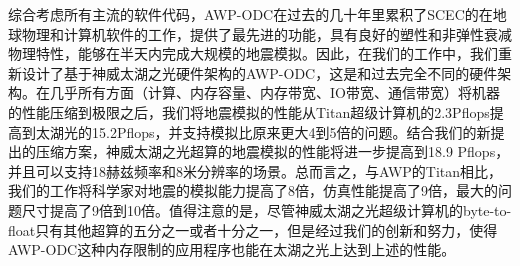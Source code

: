 \documentclass[degree=doctor]{thuthesis}
\begin{document}
综合考虑所有主流的软件代码，AWP-ODC在过去的几十年里累积了SCEC的在地球物理和计算机软件的工作，提供了最先进的功能，具有良好的塑性和非弹性衰减物理特性，能够在半天内完成大规模的地震模拟。因此，在我们的工作中，我们重新设计了基于神威太湖之光硬件架构的AWP-ODC，这是和过去完全不同的硬件架构。在几乎所有方面（计算、内存容量、内存带宽、IO带宽、通信带宽）将机器的性能压缩到极限之后，我们将地震模拟的性能从Titan超级计算机的2.3Pflops提高到太湖光的15.2Pflops，并支持模拟比原来更大4到5倍的问题。结合我们的新提出的压缩方案，神威太湖之光超算的地震模拟的性能将进一步提高到18.9 Pflops，并且可以支持18赫兹频率和8米分辨率的场景。总而言之，与AWP的Titan相比，我们的工作将科学家对地震的模拟能力提高了8倍，仿真性能提高了9倍，最大的问题尺寸提高了9倍到10倍。值得注意的是，尽管神威太湖之光超级计算机的byte-to-float只有其他超算的五分之一或者十分之一，但是经过我们的创新和努力，使得AWP-ODC这种内存限制的应用程序也能在太湖之光上达到上述的性能。
\end{document}
